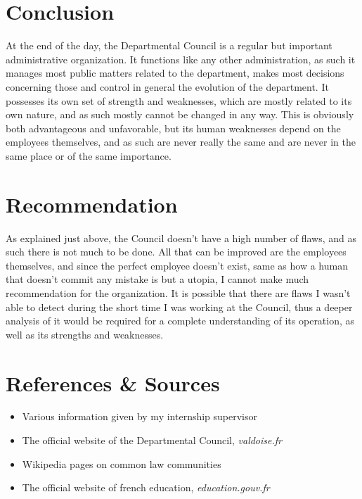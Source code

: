 \documentclass[12pt]{article}
\begin{document}
\section{Conclusion}

At the end of the day, the Departmental Council is a regular but important administrative organization. It functions like any other administration, as such it manages most public matters related to the department, makes most decisions concerning those and control in general the evolution of the department. It possesses its own set of strength and weaknesses, which are mostly related to its own nature, and as such mostly cannot be changed in any way. This is obviously both advantageous and unfavorable, but its human weaknesses depend on the employees themselves, and as such are never really the same and are never in the same place or of the same importance. 

\section{Recommendation}

As explained just above, the Council doesn't have a high number of flaws, and as such there is not much to be done. All that can be improved are the employees themselves, and since the perfect employee doesn't exist, same as how a human that doesn't commit any mistake is but a utopia, I cannot make much recommendation for the organization. It is possible that there are flaws I wasn't able to detect during the short time I was working at the Council, thus a deeper analysis of it would be required for a complete understanding of its operation, as well as its strengths and weaknesses.

\section{References \& Sources}

\begin{itemize}
    \item Various information given by my internship supervisor
    \item The official website of the Departmental Council, \textit{valdoise.fr}
    \item Wikipedia pages on common law communities
    \item The official website of french education, \textit{education.gouv.fr}
\end{itemize}
\end{document}
